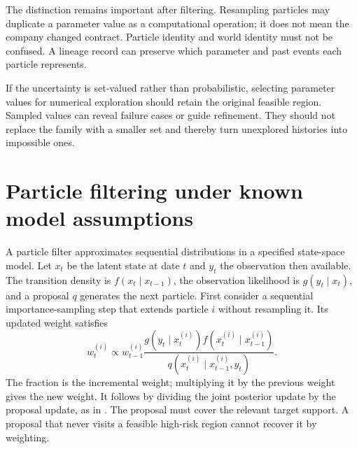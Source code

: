 The distinction remains important after filtering. Resampling particles may duplicate a parameter value as a computational operation; it does not mean the company changed contract. Particle identity and world identity must not be confused. A lineage record can preserve which parameter and past events each particle represents.

If the uncertainty is set-valued rather than probabilistic, selecting parameter values for numerical exploration should retain the original feasible region. Sampled values can reveal failure cases or guide refinement. They should not replace the family with a smaller set and thereby turn unexplored histories into impossible ones.

\section{Particle filtering under known model assumptions}
A particle filter approximates sequential distributions in a specified state-space model. Let $x_t$ be the latent state at date $t$ and $y_t$ the observation then available. The transition density is $f(x_t\mid x_{t-1})$, the observation likelihood is $g(y_t\mid x_t)$, and a proposal $q$ generates the next particle. First consider a sequential importance-sampling step that extends particle $i$ without resampling it. Its updated weight satisfies
\begin{equation}
 w_t^{(i)}\propto w_{t-1}^{(i)}\frac{g(y_t\mid x_t^{(i)})f(x_t^{(i)}\mid x_{t-1}^{(i)})}{q(x_t^{(i)}\mid x_{t-1}^{(i)},y_t)}.
\end{equation}
The fraction is the incremental weight; multiplying it by the previous weight gives the new weight. It follows by dividing the joint posterior update by the proposal update, as in \citet[Section 3.3, equations (29)--(30)]{doucet2012tutorial}. The proposal must cover the relevant target support. A proposal that never visits a feasible high-risk region cannot recover it by weighting.

